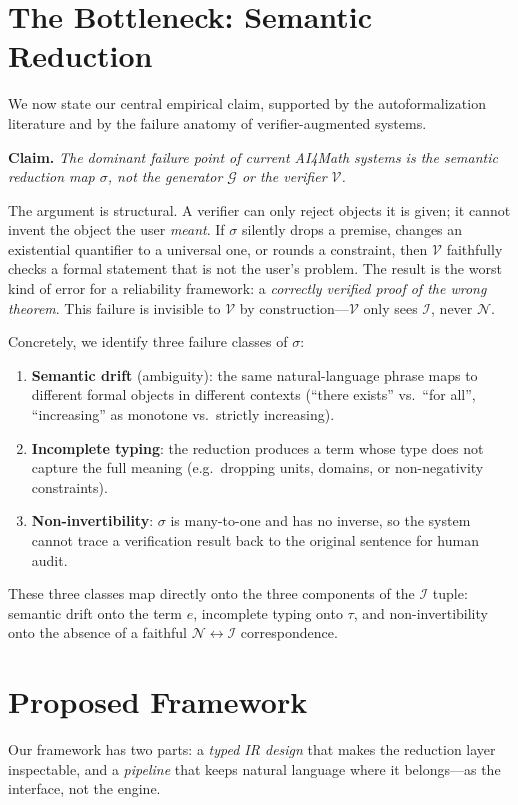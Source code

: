 \documentclass[11pt]{article}
\newcommand{\IR}{\mathcal{I}}
\newcommand{\NL}{\mathcal{N}}
\newcommand{\VV}{\mathcal{V}}
\newcommand{\GG}{\mathcal{G}}
\begin{document}
\section{The Bottleneck: Semantic Reduction}
We now state our central empirical claim, supported by the autoformalization literature and by the failure anatomy of verifier-augmented systems.

\textbf{Claim.} \emph{The dominant failure point of current AI4Math systems is the semantic reduction map $\sigma$, not the generator $\GG$ or the verifier $\VV$.}

The argument is structural. A verifier can only reject objects it is given; it cannot invent the object the user \emph{meant}. If $\sigma$ silently drops a premise, changes an existential quantifier to a universal one, or rounds a constraint, then $\VV$ faithfully checks a formal statement that is not the user's problem. The result is the worst kind of error for a reliability framework: a \emph{correctly verified proof of the wrong theorem}. This failure is invisible to $\VV$ by construction---$\VV$ only sees $\IR$, never $\NL$.

Concretely, we identify three failure classes of $\sigma$:
\begin{enumerate}
\item \textbf{Semantic drift} (ambiguity): the same natural-language phrase maps to different formal objects in different contexts (``there exists'' vs.\ ``for all'', ``increasing'' as monotone vs.\ strictly increasing).
\item \textbf{Incomplete typing}: the reduction produces a term whose type does not capture the full meaning (e.g.\ dropping units, domains, or non-negativity constraints).
\item \textbf{Non-invertibility}: $\sigma$ is many-to-one and has no inverse, so the system cannot trace a verification result back to the original sentence for human audit.
\end{enumerate}

These three classes map directly onto the three components of the $\IR$ tuple: semantic drift onto the term $e$, incomplete typing onto $\tau$, and non-invertibility onto the absence of a faithful $\NL \leftrightarrow \IR$ correspondence.

\section{Proposed Framework}
Our framework has two parts: a \emph{typed IR design} that makes the reduction layer inspectable, and a \emph{pipeline} that keeps natural language where it belongs---as the interface, not the engine.
\end{document}
